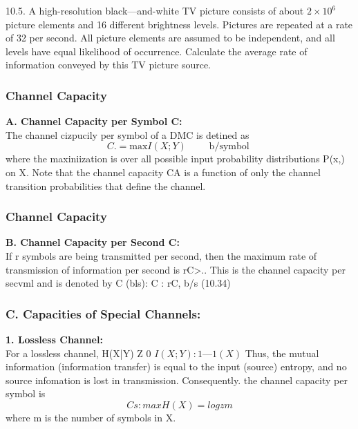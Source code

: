 \documentclass[a4]{beamer}
\begin{document}


\begin{frame}
10.5. A high-resolution black—and-white TV picture consists of about $2 \times 10^6$  picture elements and 16
different brightness levels. Pictures are repeated at a rate of 32 per second. All picture elements
are assumed to be independent, and all levels have equal likelihood of occurrence. Calculate the
average rate of information conveyed by this TV picture source.\\ \bigskip


\end{frame}



\begin{frame}
\frametitle{Channel Capacity}

\textbf{A. Channel Capacity per Symbol C:}\\
The channel cizpucily per symbol of a DMC is detined as
\[ 
C. = \mbox{max}I(X; Y) \qquad \mbox{ b/symbol }
\]
where the maxiniization is over all possible input probability distributions {P(x,)} on X. Note that the
channel capacity CA is a function of only the channel transition probabilities that define the channel.
\end{frame}

\begin{frame}
\frametitle{Channel Capacity}
\textbf{B. Channel Capacity per Second C:}\\
If r symbols are being transmitted per second, then the maximum rate of transmission of
information per second is rC>.. This is the channel capacity per secvml and is denoted by C (bls):
C : rC, b/s (10.34)
\end{frame}
\begin{frame}
\frametitle{C. Capacities of Special Channels:}
\textbf{ 1. Lossless Channel:}\\
For a lossless channel, H(X|Y) Z 0 %
$I(X; Y):1—1(X) $
Thus, the mutual information (information transfer) is equal to the input (source) entropy, and no
source infomation is lost in transmission. Consequently. the channel capacity per symbol is
\[
Cs : max H(X) = logzm %
\]
where m is the number of symbols in X.
\end{frame}
\end{document}
